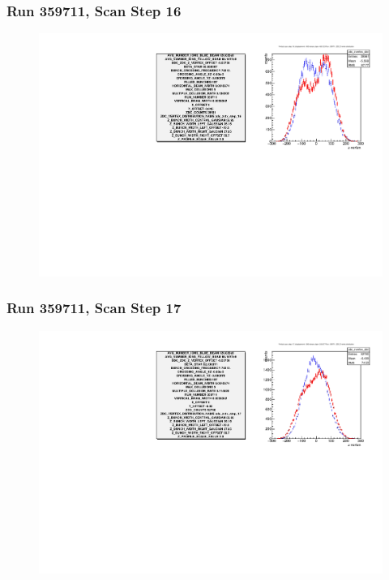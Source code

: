 \begin{frame}
\frametitle{Run 359711, Scan Step 16}
\begin{figure}
\begin{center}
\includegraphics[width=\linewidth]{"figures/359711_step_16_zdc_zvertex"}
\caption{ }
\label{fig:359711_step_16_zdc_zvertex}
\end{center}\end{figure}
\end{frame}

\begin{frame}
\frametitle{Run 359711, Scan Step 17}
\begin{figure}
\begin{center}
\includegraphics[width=\linewidth]{"figures/359711_step_17_zdc_zvertex"}
\caption{ }
\label{fig:359711_step_17_zdc_zvertex}
\end{center}\end{figure}
\end{frame}

